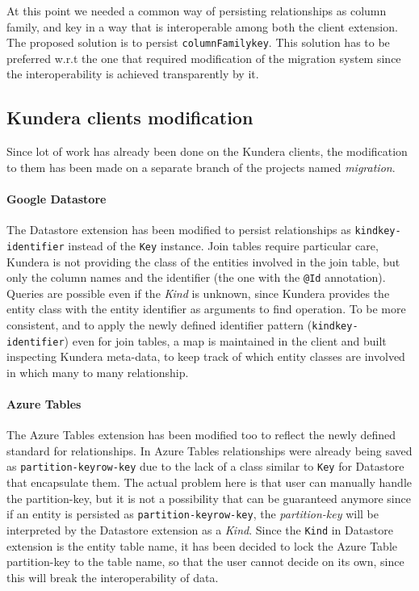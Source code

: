 \noindent At this point we needed a common way of persisting relationships as column family, and key in a way that is interoperable among both the client extension.
The proposed solution is to persist \texttt{columnFamily\textunderscore key}. This solution has to be preferred w.r.t the one that required modification of the migration system since the interoperability is achieved transparently by it.

\subsection{Kundera clients modification}
Since lot of work has already been done on the Kundera clients, the modification to them has been made on a separate branch of the projects named \textit{migration}.

\paragraph{Google Datastore} The Datastore extension has been modified to persist relationships as \texttt{kind\textunderscore key-identifier} instead of the \texttt{Key} instance.
Join tables require particular care, Kundera is not providing the class of the entities involved in the join table, but only the column names and the identifier (the one with the \texttt{@Id} annotation). Queries are possible even if the \textit{Kind} is unknown, since Kundera provides the entity class with the entity identifier as arguments to find operation.
To be more consistent, and to apply the newly defined identifier pattern (\texttt{kind\textunderscore key-identifier}) even for join tables, a map is maintained in the client and built inspecting Kundera meta-data, to keep track of which entity classes are involved in which many to many relationship.

\paragraph{Azure Tables} The Azure Tables extension has been modified too to reflect the newly defined standard for relationships. In Azure Tables relationships were already being saved as \texttt{partition-key\textunderscore row-key} due to the lack of a class similar to \texttt{Key} for Datastore that encapsulate them. The actual problem here is that user can manually handle the partition-key, but it is not a possibility that can be guaranteed anymore since if an entity is persisted as \texttt{partition-key\textunderscore row-key}, the \textit{partition-key} will be interpreted by the Datastore extension as a \textit{Kind}.
Since the \texttt{Kind} in Datastore extension is the entity table name, it has been decided to lock the Azure Table partition-key to the table name, so that the user cannot decide on its own, since this will break the interoperability of data.

